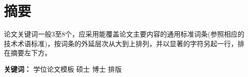 \chapter{\texorpdfstring{摘\quad 要}{摘要}}
\thispagestyle{onlyfoot}


论文关键词一般3至8个，应采用能覆盖论文主要内容的通用标准词条(参照相应的技术术语标准)，按词条的外延层次从大到上排列，并以显著的字符另起一行，排在摘要左下方。



\vspace{1em}

{%
\noindent\textbf{%
关键词：}%
学位论文模板\quad
硕士\quad
博士\quad
排版
}











